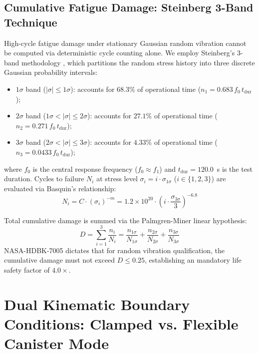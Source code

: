 \documentclass[preprint,12pt,3p]{elsarticle}
\begin{document}
\subsection{Cumulative Fatigue Damage: Steinberg 3-Band Technique}
High-cycle fatigue damage under stationary Gaussian random vibration cannot be computed via deterministic cycle counting alone. We employ Steinberg's 3-band methodology \cite{steinberg2000}, which partitions the random stress history into three discrete Gaussian probability intervals:
\begin{itemize}
  \item $1\sigma$ band ($|\sigma| \le 1\sigma$): accounts for $68.3\%$ of operational time ($n_1 = 0.683 \, f_0 \, t_{\text{dur}}$);
  \item $2\sigma$ band ($1\sigma < |\sigma| \le 2\sigma$): accounts for $27.1\%$ of operational time ($n_2 = 0.271 \, f_0 \, t_{\text{dur}}$);
  \item $3\sigma$ band ($2\sigma < |\sigma| \le 3\sigma$): accounts for $4.33\%$ of operational time ($n_3 = 0.0433 \, f_0 \, t_{\text{dur}}$);
\end{itemize}
where $f_0$ is the central response frequency ($f_0 \approx f_1$) and $t_{\text{dur}} = 120.0$~s is the test duration. Cycles to failure $N_i$ at stress level $\sigma_i = i \cdot \sigma_{1\sigma}$ ($i \in \{1, 2, 3\}$) are evaluated via Basquin's relationship:
\begin{equation}
  N_i = C \cdot \left( \sigma_i \right)^{-m} = 1.2 \times 10^{20} \cdot \left( i \cdot \frac{\sigma_{3\sigma}}{3} \right)^{-6.8}
  \label{eq:basquin}
\end{equation}

Total cumulative damage is summed via the Palmgren-Miner linear hypothesis:
\begin{equation}
  D = \sum_{i=1}^{3} \frac{n_i}{N_i} = \frac{n_{1\sigma}}{N_{1\sigma}} + \frac{n_{2\sigma}}{N_{2\sigma}} + \frac{n_{3\sigma}}{N_{3\sigma}}
  \label{eq:miner}
\end{equation}
NASA-HDBK-7005 \cite{nasa2001} dictates that for random vibration qualification, the cumulative damage must not exceed $D \le 0.25$, establishing an mandatory life safety factor of $4.0\times$.

\section{Dual Kinematic Boundary Conditions: Clamped vs. Flexible Canister Mode}
\label{sec:boundary}
\end{document}
